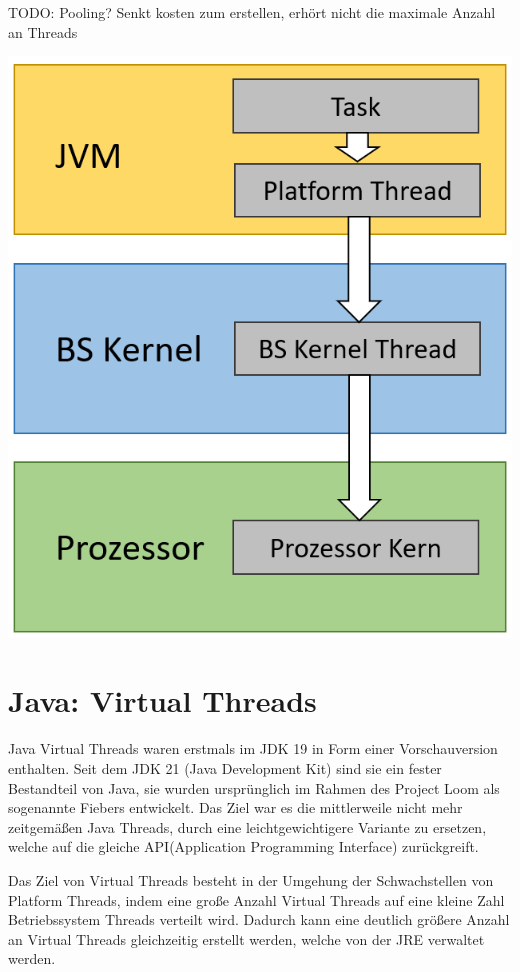 \documentclass[fontsize=12pt,paper=a4,twoside=semi,parskip=half-,headsepline,headinclude]{scrreprt}
\begin{document}
TODO: Pooling? Senkt kosten zum erstellen, erhört nicht die maximale Anzahl an Threads

\includegraphics[scale=0.5]{figures/PlatformThreads.png}

\section{Java: Virtual Threads}

Java Virtual Threads waren erstmals im JDK 19 in Form einer Vorschauversion enthalten. Seit dem JDK 21 (Java Development Kit) sind sie ein fester Bestandteil von Java, sie wurden ursprünglich im Rahmen des Project Loom als sogenannte Fiebers entwickelt. Das Ziel war es die mittlerweile nicht mehr zeitgemäßen Java Threads, durch eine leichtgewichtigere Variante zu ersetzen, welche auf die gleiche API(Application Programming Interface) zurückgreift.

Das Ziel von Virtual Threads besteht in der Umgehung der Schwachstellen von Platform Threads, indem eine große Anzahl Virtual Threads auf eine kleine Zahl Betriebssystem Threads verteilt wird. Dadurch kann eine deutlich größere Anzahl an Virtual Threads gleichzeitig erstellt werden, welche von der JRE verwaltet werden.
\end{document}
